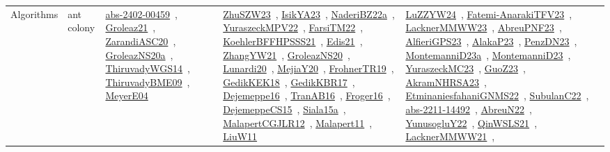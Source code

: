 {\begin{longtable}{lp{3cm}>{\raggedright\arraybackslash}p{6cm}>{\raggedright\arraybackslash}p{6cm}>{\raggedright\arraybackslash}p{8cm}}
\index{ant colony}\index{Algorithms!ant colony}Algorithms & ant colony & \href{../works/abs-2402-00459.pdf}{abs-2402-00459}~\cite{abs-2402-00459}, \href{../works/Groleaz21.pdf}{Groleaz21}~\cite{Groleaz21}, \href{../works/ZarandiASC20.pdf}{ZarandiASC20}~\cite{ZarandiASC20}, \href{../works/GroleazNS20a.pdf}{GroleazNS20a}~\cite{GroleazNS20a}, \href{../works/ThiruvadyWGS14.pdf}{ThiruvadyWGS14}~\cite{ThiruvadyWGS14}, \href{../works/ThiruvadyBME09.pdf}{ThiruvadyBME09}~\cite{ThiruvadyBME09}, \href{../works/MeyerE04.pdf}{MeyerE04}~\cite{MeyerE04} & \href{../works/ZhuSZW23.pdf}{ZhuSZW23}~\cite{ZhuSZW23}, \href{../works/IsikYA23.pdf}{IsikYA23}~\cite{IsikYA23}, \href{../works/NaderiBZ22a.pdf}{NaderiBZ22a}~\cite{NaderiBZ22a}, \href{../works/YuraszeckMPV22.pdf}{YuraszeckMPV22}~\cite{YuraszeckMPV22}, \href{../works/FarsiTM22.pdf}{FarsiTM22}~\cite{FarsiTM22}, \href{../works/KoehlerBFFHPSSS21.pdf}{KoehlerBFFHPSSS21}~\cite{KoehlerBFFHPSSS21}, \href{../works/Edis21.pdf}{Edis21}~\cite{Edis21}, \href{../works/ZhangYW21.pdf}{ZhangYW21}~\cite{ZhangYW21}, \href{../works/GroleazNS20.pdf}{GroleazNS20}~\cite{GroleazNS20}, \href{../works/Lunardi20.pdf}{Lunardi20}~\cite{Lunardi20}, \href{../works/MejiaY20.pdf}{MejiaY20}~\cite{MejiaY20}, \href{../works/FrohnerTR19.pdf}{FrohnerTR19}~\cite{FrohnerTR19}, \href{../works/GedikKEK18.pdf}{GedikKEK18}~\cite{GedikKEK18}, \href{../works/GedikKBR17.pdf}{GedikKBR17}~\cite{GedikKBR17}, \href{../works/Dejemeppe16.pdf}{Dejemeppe16}~\cite{Dejemeppe16}, \href{../works/TranAB16.pdf}{TranAB16}~\cite{TranAB16}, \href{../works/Froger16.pdf}{Froger16}~\cite{Froger16}, \href{../works/DejemeppeCS15.pdf}{DejemeppeCS15}~\cite{DejemeppeCS15}, \href{../works/Siala15a.pdf}{Siala15a}~\cite{Siala15a}, \href{../works/MalapertCGJLR12.pdf}{MalapertCGJLR12}~\cite{MalapertCGJLR12}, \href{../works/Malapert11.pdf}{Malapert11}~\cite{Malapert11}, \href{../works/LiuW11.pdf}{LiuW11}~\cite{LiuW11} & \href{../works/LuZZYW24.pdf}{LuZZYW24}~\cite{LuZZYW24}, \href{../works/Fatemi-AnarakiTFV23.pdf}{Fatemi-AnarakiTFV23}~\cite{Fatemi-AnarakiTFV23}, \href{../works/LacknerMMWW23.pdf}{LacknerMMWW23}~\cite{LacknerMMWW23}, \href{../works/AbreuPNF23.pdf}{AbreuPNF23}~\cite{AbreuPNF23}, \href{../works/AlfieriGPS23.pdf}{AlfieriGPS23}~\cite{AlfieriGPS23}, \href{../works/AlakaP23.pdf}{AlakaP23}~\cite{AlakaP23}, \href{../works/PenzDN23.pdf}{PenzDN23}~\cite{PenzDN23}, \href{../works/MontemanniD23a.pdf}{MontemanniD23a}~\cite{MontemanniD23a}, \href{../works/MontemanniD23.pdf}{MontemanniD23}~\cite{MontemanniD23}, \href{../works/YuraszeckMC23.pdf}{YuraszeckMC23}~\cite{YuraszeckMC23}, \href{../works/GuoZ23.pdf}{GuoZ23}~\cite{GuoZ23}, \href{../works/AkramNHRSA23.pdf}{AkramNHRSA23}~\cite{AkramNHRSA23}, \href{../works/EtminaniesfahaniGNMS22.pdf}{EtminaniesfahaniGNMS22}~\cite{EtminaniesfahaniGNMS22}, \href{../works/SubulanC22.pdf}{SubulanC22}~\cite{SubulanC22}, \href{../works/abs-2211-14492.pdf}{abs-2211-14492}~\cite{abs-2211-14492}, \href{../works/AbreuN22.pdf}{AbreuN22}~\cite{AbreuN22}, \href{../works/YunusogluY22.pdf}{YunusogluY22}~\cite{YunusogluY22}, \href{../works/QinWSLS21.pdf}{QinWSLS21}~\cite{QinWSLS21}, \href{../works/LacknerMMWW21.pdf}{LacknerMMWW21}~\cite{LacknerMMWW21}, 
\end{longtable}}
